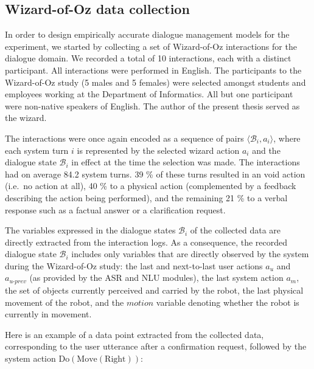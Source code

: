 \subsection{Wizard-of-Oz data collection}
\label{sec:wozcollection-exp3}

In order to design empirically accurate dialogue management models for the experiment, we started by collecting a set of Wizard-of-Oz interactions for the dialogue domain. We recorded a total of 10 interactions, each with a distinct participant. All interactions were performed in English. The participants to the Wizard-of-Oz study (5 males and 5 females) were selected amongst students and employees working at the Department of Informatics. All but one participant were non-native speakers of English. The author of the present thesis served as the wizard.

The interactions were once again encoded as a sequence of pairs $\langle \mathcal{B}_i, a_i \rangle$, where each system turn $i$ is represented by the selected wizard action $a_i$ and the dialogue state $\mathcal{B}_i$ in effect at the time the selection was made. The interactions had on average 84.2 system turns.  39 \% of these turns resulted in an void action (i.e.\ no action at all), 40 \% to a physical action (complemented by a feedback describing the action being performed), and the remaining 21 \% to a verbal response such as a factual answer or a clarification request. 

The variables expressed in the dialogue states $\mathcal{B}_i$ of the collected data are directly extracted from the interaction logs. As a consequence, the recorded dialogue state $\mathcal{B}_i$ includes only variables that are directly observed by the system during the Wizard-of-Oz study: the last and next-to-last user actions $a_u$ and $a_{u\mbox{-}prev}$ (as provided by the ASR and NLU modules), the last system action $a_m$, the set of objects currently perceived and carried by the robot, the last physical movement of the robot, and the $\mathit{motion}$ variable denoting whether the robot is currently in movement. 

Here is an example of a data point extracted from the collected data, corresponding to the user utterance  after a confirmation request, followed by the system action $\mathrm{Do(Move(Right))}$: 

